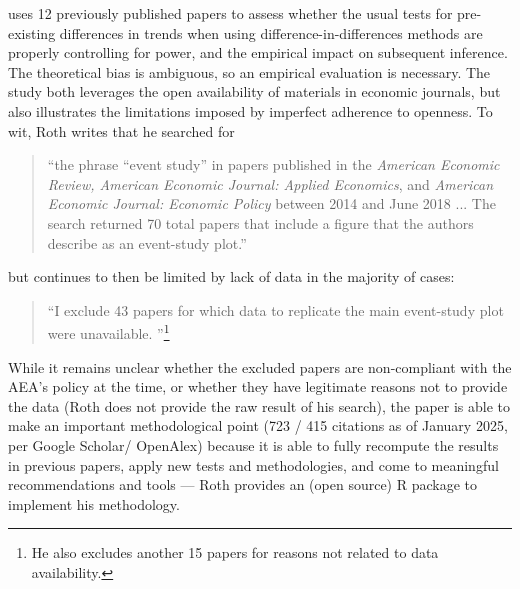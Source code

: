 \documentclass{Revue-economique}
\newcommand{\citep}{\parencite}
\newcommand{\citet}{\textcite}
\begin{document}
\begin{Article} [%
	Titre={Reproducibility and Open Science in Economics},
	Auteur={Lars Vilhuber\thanks{Cornell University, lars.vilhuber@cornell.edu}}]
\begin{refsection}[Main]
\citet{roth_pretest_2022}  uses 12 previously published papers to assess whether the usual tests for pre-existing differences in trends when using difference-in-differences methods are properly controlling for power, and the empirical impact on subsequent inference. The theoretical bias is ambiguous, so an empirical evaluation is necessary. The study both leverages the open availability of materials in economic journals, but also illustrates the limitations imposed by imperfect adherence to openness. To wit, Roth writes that he searched for 
%
\begin{quote}
``the phrase “event study” in papers published in the \textit{American Economic Review, American Economic Journal: Applied Economics}, and \textit{American Economic Journal: Economic Policy} between
2014 and June 2018 ... The search returned 70 total papers that include a figure that the authors describe as an event-study plot.''
\end{quote}
%
but continues to then be limited by lack of data in the majority of cases:

\begin{quote}
    ``I exclude 43 papers for which data to replicate the main event-study plot were unavailable. \citep[pg. 307]{roth_pretest_2022}''\footnote{He also excludes another 15 papers for reasons not related to data availability.}
\end{quote}

While it remains unclear whether the excluded papers are non-compliant with the AEA's policy at the time, or whether they have legitimate reasons not to provide the data (Roth does not provide the raw result of his search), the paper is able to make an important methodological point (723 / 415 citations as of January 2025, per Google Scholar/ OpenAlex) because it is able to fully recompute the results in previous papers, apply new tests and methodologies, and come to meaningful recommendations and tools --- Roth provides an (open source) R package to implement his methodology.


\end{refsection}
\end{Article}
\end{document}
